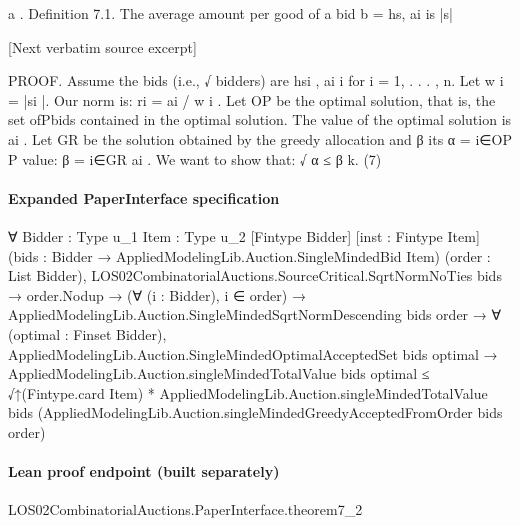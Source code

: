 \documentclass[10pt]{article}
\begin{document}
\begin{ReviewVerbatim}

a
.
Definition 7.1. The average amount per good of a bid b = hs, ai is |s|

[Next verbatim source excerpt]

PROOF. Assume the bids (i.e.,
√ bidders) are hsi , ai i for i = 1, . . . , n. Let
w i = |si |. Our norm is: ri = ai / w i . Let OP be the optimal solution, that is, the
set ofPbids contained in the optimal solution. The value of the optimal solution is
ai . Let GR be the solution obtained by the greedy allocation and β its
α = i∈OP P
value: β = i∈GR ai . We want to show that:
√
α ≤ β k.
(7)
\end{ReviewVerbatim}



\paragraph{Expanded PaperInterface specification}
\begin{ReviewVerbatim}
∀ {Bidder : Type u_1} {Item : Type u_2} [Fintype Bidder] [inst : Fintype Item]
  (bids : Bidder → AppliedModelingLib.Auction.SingleMindedBid Item) (order : List Bidder),
  LOS02CombinatorialAuctions.SourceCritical.SqrtNormNoTies bids →
    order.Nodup →
      (∀ (i : Bidder), i ∈ order) →
        AppliedModelingLib.Auction.SingleMindedSqrtNormDescending bids order →
          ∀ (optimal : Finset Bidder),
            AppliedModelingLib.Auction.SingleMindedOptimalAcceptedSet bids optimal →
              AppliedModelingLib.Auction.singleMindedTotalValue bids optimal ≤
                √↑(Fintype.card Item) *
                  AppliedModelingLib.Auction.singleMindedTotalValue bids
                    (AppliedModelingLib.Auction.singleMindedGreedyAcceptedFromOrder bids order)
\end{ReviewVerbatim}



\paragraph{Lean proof endpoint (built separately)}\begin{ReviewVerbatim}
LOS02CombinatorialAuctions.PaperInterface.theorem7_2
\end{ReviewVerbatim}
\end{document}
